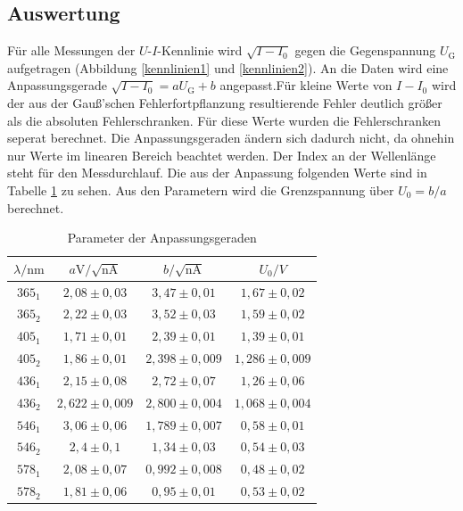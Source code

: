 \subsection{Auswertung}
Für alle Messungen der $U$-$I$-Kennlinie wird $\sqrt{I-I_0}$ gegen die Gegenspannung $U_\mathrm{G}$ aufgetragen (Abbildung \ref{kennlinien1} und \ref{kennlinien2}). An die Daten wird eine Anpassungsgerade $\sqrt{I-I_0}=aU_\mathrm{G}+b$ angepasst.Für kleine Werte von $I-I_0$ wird der aus der Gauß'schen Fehlerfortpflanzung resultierende Fehler deutlich größer als die absoluten Fehlerschranken. Für diese Werte wurden die Fehlerschranken seperat berechnet. Die Anpassungsgeraden ändern sich dadurch nicht, da ohnehin nur Werte im linearen Bereich beachtet werden. Der Index an der Wellenlänge steht für den Messdurchlauf. Die aus der Anpassung folgenden Werte sind in Tabelle \ref{tab:photoeffekt} zu sehen. Aus den Parametern wird die Grenzspannung über $U_0=b/a$ berechnet. 

\newpage

\begin{table}[h]
  \centering
    \begin{tabular}{c c c c}
      \toprule
      $\lambda/\mathrm{nm}$ & $a\mathrm{V}/ \sqrt{\mathrm{nA}}$ & $b/\sqrt{\mathrm{nA}}$ & $U_0/V$\\
      \midrule
      $365_1$ & $2,08 \pm 0,03 $ &$3,47 \pm 0,01 $ & $1,67 \pm 0,02$\\
      $365_2$ & $2,22 \pm 0,03 $ &$3,52 \pm 0,03  $ & $1,59 \pm 0,02$\\
      $405_1$ & $1,71 \pm 0,01 $ &$2,39 \pm 0,01 $ & $1,39 \pm 0,01$\\
      $405_2$ & $1,86 \pm 0,01 $ &$2,398 \pm 0,009$ & $1,286 \pm 0,009$\\
      $436_1$ & $2,15 \pm 0,08 $ &$2,72 \pm 0,07  $ & $1,26 \pm 0,06  $\\
      $436_2$ & $2,622 \pm 0,009$ &$2,800 \pm 0,004$ & $1,068 \pm 0,004 $\\
      $546_1$ & $3,06 \pm 0,06 $ &$1,789 \pm 0,007$ & $0,58 \pm 0,01$\\
      $546_2$ & $2,4 \pm 0,1  $ &$1,34 \pm 0,03  $ & $0,54 \pm 0,03$\\
      $578_1$ & $2,08 \pm 0,07 $ &$0,992 \pm 0,008$ & $0,48 \pm 0,02$\\
      $578_2$ & $1,81 \pm 0,06 $ &$0,95 \pm 0,01$ & $0,53 \pm 0,02$\\
      \bottomrule
    \end{tabular}
    \caption{Parameter der Anpassungsgeraden}
    \label{tab:photoeffekt}
\end{table}

